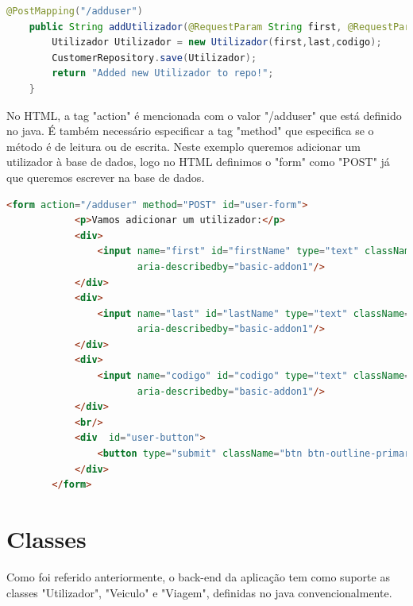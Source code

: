 \documentclass[11pt,a4paper]{report}%
\begin{document}
\begin{lstlisting}[language=Java, caption=@PostMapping no java]
@PostMapping("/adduser")
    public String addUtilizador(@RequestParam String first, @RequestParam String last, @RequestParam String codigo) {
        Utilizador Utilizador = new Utilizador(first,last,codigo);
        CustomerRepository.save(Utilizador);
        return "Added new Utilizador to repo!";
    }
\end{lstlisting}

No HTML, a tag "action" é mencionada com o valor "/adduser" que está definido no java. É também necessário especificar a tag "method" que especifica se o método é de leitura ou de escrita. Neste exemplo queremos adicionar um utilizador à base de dados, logo no HTML definimos o "form" como "POST" já que queremos escrever na base de dados.

\begin{lstlisting}[language=Html, caption=Método "Post" no Html]
 <form action="/adduser" method="POST" id="user-form">
            <p>Vamos adicionar um utilizador:</p>
            <div>
                <input name="first" id="firstName" type="text" className="form-control" placeholder="Nome próprio" aria-label="Username"
                       aria-describedby="basic-addon1"/>
            </div>
            <div>
                <input name="last" id="lastName" type="text" className="form-control" placeholder="Apelido" aria-label="Username"
                       aria-describedby="basic-addon1"/>
            </div>
            <div>
                <input name="codigo" id="codigo" type="text" className="form-control" placeholder="Codigo" aria-label="Username"
                       aria-describedby="basic-addon1"/>
            </div>
            <br/>
            <div  id="user-button">
                <button type="submit" className="btn btn-outline-primary me-2">Adicionar Utilizador</button>
            </div>
        </form>
\end{lstlisting}

\section{Classes}

Como foi referido anteriormente, o back-end da aplicação tem como suporte as classes "Utilizador", "Veiculo" e "Viagem", definidas no java convencionalmente.\\
\end{document}
